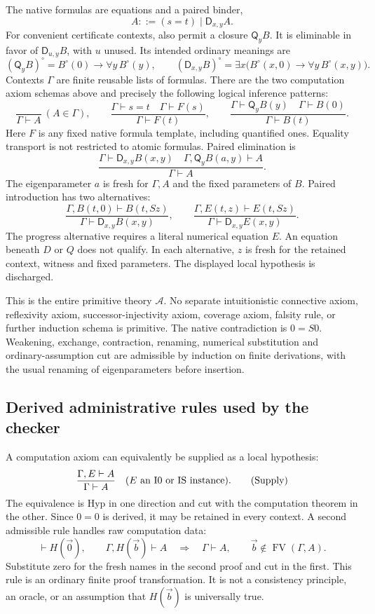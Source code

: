 \documentclass[11pt,letterpaper]{article}
\theoremstyle{definition}\newtheorem{definition}[theorem]{Definition}
\theoremstyle{remark}\newtheorem{remark}[theorem]{Remark}
\newcommand{\D}{\mathsf D}
\newcommand{\Q}{\mathsf Q}
\newcommand{\FV}{\operatorname{FV}}
\begin{document}
The native formulas are equations and a paired binder,
\[
 A ::= (s=t)\mid \D_{x,y}A.
\]
For convenient certificate contexts, also permit a closure \(\Q_yB\).
It is eliminable in favor of \(\D_{u,y}B\), with \(u\) unused.
Its intended ordinary meanings are
\[
 (\Q_yB)^\circ=B^\circ(0)\to\forall y\,B^\circ(y),
 \qquad
 (\D_{x,y}B)^\circ=
 \exists x\bigl(B^\circ(x,0)\to\forall y\,B^\circ(x,y)\bigr).
\]
Contexts \(\Gamma\) are finite reusable lists of formulas. There are
the two computation axiom schemas above and precisely the following
logical inference patterns:
\[
 \frac{}{\Gamma\vdash A}\ (A\in\Gamma),\qquad
 \frac{\Gamma\vdash s=t\quad\Gamma\vdash F(s)}
      {\Gamma\vdash F(t)},\qquad
 \frac{\Gamma\vdash\Q_yB(y)\quad\Gamma\vdash B(0)}
      {\Gamma\vdash B(t)}.
 \tag{Hyp, Tr, QE}
\]
Here \(F\) is any fixed native formula template, including quantified
ones. Equality transport is not restricted to atomic formulas. Paired
elimination is
\[
 \frac{\Gamma\vdash\D_{x,y}B(x,y)\quad
       \Gamma,\Q_yB(a,y)\vdash A}{\Gamma\vdash A}.
 \tag{DE}
\]
The eigenparameter \(a\) is fresh for \(\Gamma,A\) and the fixed
parameters of \(B\). Paired introduction has two alternatives:
\[
 \frac{\Gamma,B(t,0)\vdash B(t,Sz)}
      {\Gamma\vdash\D_{x,y}B(x,y)},\qquad
 \frac{\Gamma,E(t,z)\vdash E(t,Sz)}
      {\Gamma\vdash\D_{x,y}E(x,y)}.
 \tag{DI-case, DI-progress}
\]
The progress alternative requires a literal numerical equation \(E\).
An equation beneath \(D\) or \(Q\) does not qualify. In each
alternative, \(z\) is fresh for the retained context, witness and
fixed parameters. The displayed local hypothesis is discharged.

This is the entire primitive theory \(\mathcal A\). No separate
intuitionistic connective axiom, reflexivity axiom, successor-injectivity
axiom, coverage axiom, falsity rule, or further induction schema is
primitive. The native contradiction is \(0=S0\). Weakening, exchange,
contraction, renaming, numerical substitution and ordinary-assumption
cut are admissible by induction on finite derivations, with the usual
renaming of eigenparameters before insertion.

\subsection{Derived administrative rules used by the checker}

A computation axiom can equivalently be supplied as a local hypothesis:
\[
 \frac{\Gamma,E\vdash A}{\Gamma\vdash A}
 \quad(E\hbox{ an I0 or IS instance}).\tag{Supply}
\]
The equivalence is Hyp in one direction and cut with the computation
theorem in the other. Since \(0=0\) is derived, it may be retained in
every context. A second admissible rule handles raw computation data:
\[
 \vdash H(\vec0),\qquad \Gamma,H(\vec b)\vdash A
 \quad\Longrightarrow\quad\Gamma\vdash A,
 \qquad\vec b\notin\FV(\Gamma,A).
 \tag{Zero instance}
\]
Substitute zero for the fresh names in the second proof and cut in the
first. This rule is an ordinary finite proof transformation. It is not
a consistency principle, an oracle, or an assumption that \(H(\vec b)\)
is universally true.
\end{document}
